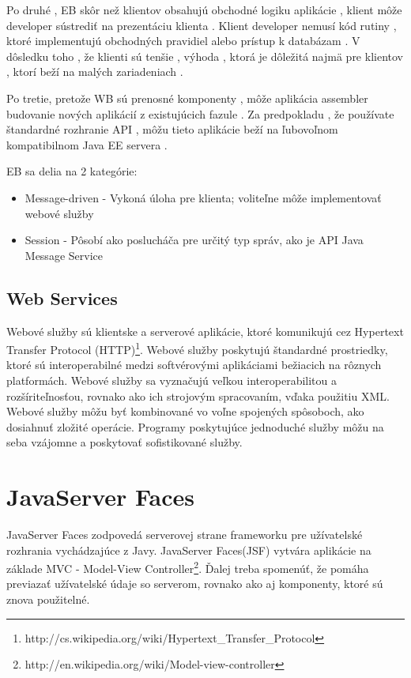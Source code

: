 Po druhé , EB skôr než klientov obsahujú obchodné logiku aplikácie , klient môže developer sústrediť na prezentáciu klienta . Klient developer nemusí kód rutiny , ktoré implementujú obchodných pravidiel alebo prístup k databázam . V dôsledku toho , že klienti sú tenšie , výhoda , ktorá je dôležitá najmä pre klientov , ktorí beží na malých zariadeniach .

Po tretie, pretože WB sú prenosné komponenty , môže aplikácia assembler budovanie nových aplikácií z existujúcich fazule . Za predpokladu , že používate štandardné rozhranie API , môžu tieto aplikácie beží na ľubovoľnom kompatibilnom Java EE servera .

EB sa delia na 2 kategórie:
\begin{itemize}
\item Message-driven - Vykoná úloha pre klienta; voliteľne môže implementovať webové služby
\item Session - Pôsobí ako poslucháča pre určitý typ správ, ako je API Java Message Service

\end{itemize}


\subsection{Web Services}
Webové služby sú klientske a serverové aplikácie, ktoré komunikujú cez Hypertext Transfer Protocol (HTTP)\footnote{http://cs.wikipedia.org/wiki/Hypertext\_Transfer\_Protocol}. Webové služby poskytujú štandardné prostriedky, ktoré sú interoperabilné medzi softvérovými aplikáciami bežiacich na rôznych platformách. Webové služby sa vyznačujú veľkou interoperabilitou a rozšíriteľnosťou, rovnako ako ich strojovým spracovaním, vďaka použitiu XML. Webové služby môžu byť kombinované vo voľne spojených spôsoboch, ako dosiahnuť zložité operácie. Programy poskytujúce jednoduché služby môžu na seba vzájomne a poskytovať sofistikované služby.

\section{JavaServer Faces}
JavaServer Faces zodpovedá serverovej strane frameworku pre užívatelské rozhrania vychádzajúce z Javy. JavaServer Faces(JSF) vytvára aplikácie na základe MVC - Model-View Controller\footnote{http://en.wikipedia.org/wiki/Model-view-controller}. Ďalej treba spomenúť, že pomáha previazať užívatelské údaje so serverom, rovnako ako aj komponenty, ktoré sú znova použitelné.

